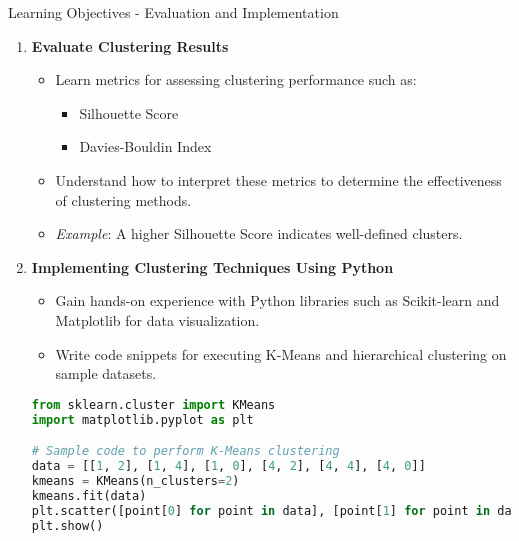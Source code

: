\documentclass[aspectratio=169]{beamer}
\begin{document}
\begin{frame}[fragile]{Learning Objectives - Evaluation and Implementation}
  \begin{enumerate}[resume]
    \item \textbf{Evaluate Clustering Results}
      \begin{itemize}
        \item Learn metrics for assessing clustering performance such as:
          \begin{itemize}
            \item Silhouette Score
            \item Davies-Bouldin Index
          \end{itemize}
        \item Understand how to interpret these metrics to determine the effectiveness of clustering methods.
        \item \emph{Example}: A higher Silhouette Score indicates well-defined clusters.
      \end{itemize}
    
    \item \textbf{Implementing Clustering Techniques Using Python}
      \begin{itemize}
        \item Gain hands-on experience with Python libraries such as Scikit-learn and Matplotlib for data visualization.
        \item Write code snippets for executing K-Means and hierarchical clustering on sample datasets.
      \end{itemize}
      \begin{lstlisting}[language=Python]
from sklearn.cluster import KMeans
import matplotlib.pyplot as plt

# Sample code to perform K-Means clustering
data = [[1, 2], [1, 4], [1, 0], [4, 2], [4, 4], [4, 0]]
kmeans = KMeans(n_clusters=2)
kmeans.fit(data)
plt.scatter([point[0] for point in data], [point[1] for point in data], c=kmeans.labels_)
plt.show()
      \end{lstlisting}
  \end{enumerate}
\end{frame}
\end{document}
